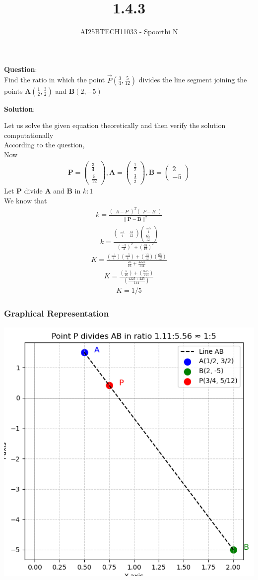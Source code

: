 \documentclass{beamer}
\title{1.4.3}
\author{AI25BTECH11033 - Spoorthi N}
\providecommand{\brak}[1]{\ensuremath{\left(#1\right)}}
\theoremstyle{remark}
\newcommand{\myvec}[1]{\ensuremath{\begin{pmatrix}#1\end{pmatrix}}}
\let\vec\mathbf
\numberwithin{equation}{section}
\begin{document}
{\let\newpage\relax\maketitle}
\renewcommand{\thefigure}{\theenumi}
\renewcommand{\thetable}{\theenumi}

\textbf{Question}:\\
\noindent Find the ratio in which the point $\Vec{P}\brak{\frac{3}{4},\frac{5}{12}} $ divides the line segment joining the points $\vec{A}\brak{\frac{1}{2},\frac{3}{2}}$ and $\vec{B}\brak{2,-5}$

\textbf{Solution}:

Let us solve the given equation theoretically and then verify the solution computationally \\
According to the question, \\
Now\\
\begin{align}
\vec{P}=\myvec{\frac{3}{4}\\ \frac{5}{12}},\vec{A}=\myvec{\frac{1}{2} \\ \frac{3}{2}},\vec{B}=\myvec{2\\-5}
\end{align}
Let $\vec{P}$ divide $\vec{A}$ and $\vec{B}$ in $k:1$ \\
We know that 
\begin{align}
   k= \frac{\myvec{A-P}^T\myvec{P-B}}{\|\vec{P-B}\|^2} 
   \end{align}
   \begin{align}
   k=\frac{\myvec{\frac{-1}{4} & \frac{13}{12}}\myvec{\frac{-5}{4} \\ \frac{65}{12}}}{(\frac{-5}{4})^2+(\frac{65}{12})^2} 
   \end{align}
   \begin{align}
       K=\frac{(\frac{-1}{4})(\frac{-5}{4})+(\frac{13}{12})(\frac{65}{12})}{\frac{25}{16}+\frac{4225}{144}}
 \end{align}
 \begin{align}
     K=\frac{(\frac{5}{16})+(\frac{845}{144})}{(\frac{4225+225}{144})}
 \end{align}
\begin{align}
    K=1/5
\end{align}
\begin{frame}
\frametitle{Graphical Representation}
    \centering
    \includegraphics[width=0.7\linewidth]{figs/fig1.png}
\end{frame}
\end{document}
